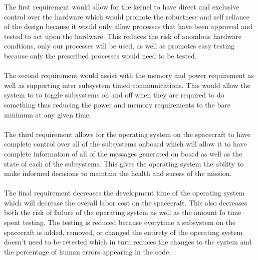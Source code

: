 \documentclass[12pt]{article}
\begin{document}
        The first requirement would allow for the kernel to have direct and exclusive control over the hardware which would
        promote the robustness and self reliance of the design because it would only allow processes that have been approved 
        and tested to act upon the hardware. This reduces the risk of anomlous hardware condtions, only our processes will be 
        used, as well as promotes easy testing because only the prescribed processes would need to be tested. \\
        \\
        The second requirement would assist with the memory and power requirement as well as supporting inter subsystem timed 
        communications. This would allow the system to to toggle subsystems on and off when they are required to do something 
        thus reducing the power and memory requirements to the bare minimum at any given time. \\
        \\
        The third requirement allows for the operating system on the spacecraft to have complete control over all of the subsystems
        onboard which will allow it to have complete information of all of the messages generated on board as well as the state of 
        each of the subsystems. This gives the operating system the ability to make informed decisions to maintain the health and 
        sucess of the mission. \\
        \\
        The final requirement decreases the development time of the operating system which will decrease the overall labor cost on
        the spacecraft. This also decreases both the risk of failure of the operating system as well as the amount fo time spent 
        testing. The testing is reduced because everytime a subsystem on the spacecraft is added, removed, or changed the entirety
        of the operating system doesn't need to be retested which in turn reduces the changes to the system and the percentage of
        human errors appearing in the code.
        \\
        \\
\end{document}
